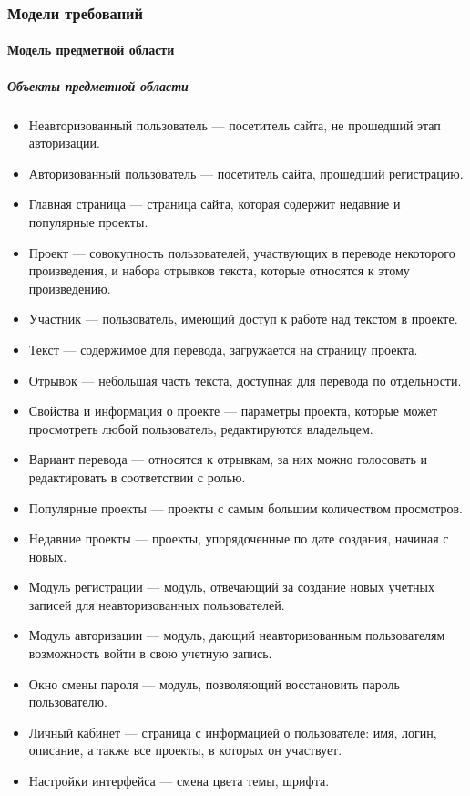 \documentclass[a4paper,12pt]{article}
\begin{document}
\subsubsection{Модели требований}
\paragraph{Модель предметной области}
\subparagraph{Объекты предметной области}
\begin{itemize}
\item Неавторизованный пользователь — посетитель сайта, не прошедший этап авторизации.
\item Авторизованный пользователь — посетитель сайта, прошедший регистрацию.
\item Главная страница — страница сайта, которая содержит недавние и популярные проекты.
\item Проект — совокупность пользователей, участвующих в переводе некоторого произведения, и набора отрывков текста, которые относятся к этому произведению.
\item Участник — пользователь, имеющий доступ к работе над текстом в проекте.
\item Текст — содержимое для перевода, загружается на страницу проекта.
\item Отрывок — небольшая часть текста, доступная для перевода по отдельности.
\item Свойства и информация о проекте — параметры проекта, которые может просмотреть любой пользователь, редактируются владельцем.
\item Вариант перевода — относятся к отрывкам, за них можно голосовать и редактировать в соответствии с ролью.
\item Популярные проекты — проекты с самым большим количеством просмотров.
\item Недавние проекты — проекты, упорядоченные по дате создания, начиная с новых.
\item Модуль регистрации — модуль, отвечающий за создание новых учетных записей для неавторизованных пользователей.
\item Модуль авторизации — модуль, дающий неавторизованным пользователям возможность войти в свою учетную запись.
\item Окно смены пароля — модуль, позволяющий восстановить пароль пользователю.
\item Личный кабинет — страница с информацией о пользователе: имя, логин, описание, а также все проекты, в которых он участвует.
\item Настройки интерфейса — смена цвета темы, шрифта.

\end{itemize}
\end{document}
